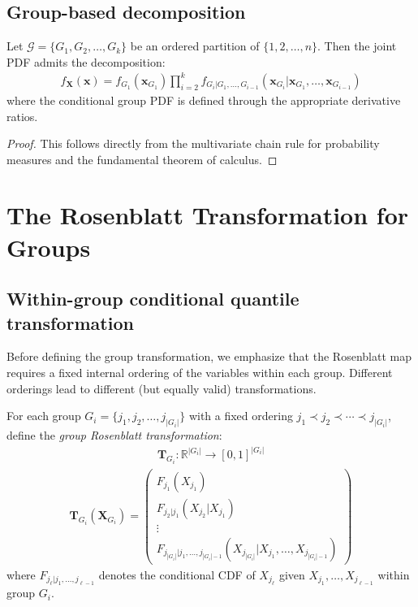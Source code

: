 \subsection{Group-based decomposition}
\begin{theorem}
\label{thm:group_chain_rule}
Let $\mathcal{G} = \{G_1, G_2, \ldots, G_k\}$ be an ordered partition of $\{1, 2, \ldots, n\}$. Then the joint PDF admits the decomposition:
\begin{align}
f_{\mathbf{X}}(\mathbf{x}) = f_{G_1}(\mathbf{x}_{G_1}) \prod_{i=2}^k f_{G_i|G_1,\ldots,G_{i-1}}(\mathbf{x}_{G_i} | \mathbf{x}_{G_1}, \ldots, \mathbf{x}_{G_{i-1}})
\end{align}
where the conditional group PDF is defined through the appropriate derivative ratios.
\end{theorem}
\begin{proof}
This follows directly from the multivariate chain rule for probability measures and the fundamental theorem of calculus.
\end{proof}

\section{The Rosenblatt Transformation for Groups}
\subsection{Within-group conditional quantile transformation}
Before defining the group transformation, we emphasize that the Rosenblatt map requires a fixed internal ordering of the variables within each group. Different orderings lead to different (but equally valid) transformations.

\begin{definition}
\label{def:rosenblatt_group}
For each group $G_i = \{j_1, j_2, \ldots, j_{|G_i|}\}$ with a fixed ordering $j_1 \prec j_2 \prec \cdots \prec j_{|G_i|}$, define the \emph{group Rosenblatt transformation}:
\begin{align}
\mathbf{T}_{G_i}: \mathbb{R}^{|G_i|} \to [0,1]^{|G_i|}
\end{align}
\begin{align}
\mathbf{T}_{G_i}(\mathbf{X}_{G_i}) = \begin{pmatrix}
F_{j_1}(X_{j_1}) \\
F_{j_2|j_1}(X_{j_2}|X_{j_1}) \\
\vdots \\
F_{j_{|G_i|}|j_1,\ldots,j_{|G_i|-1}}(X_{j_{|G_i|}}|X_{j_1}, \ldots, X_{j_{|G_i|-1}})
\end{pmatrix}
\end{align}
where $F_{j_\ell|j_1,\ldots,j_{\ell-1}}$ denotes the conditional CDF of $X_{j_\ell}$ given $X_{j_1}, \ldots, X_{j_{\ell-1}}$ within group $G_i$.
\end{definition}


